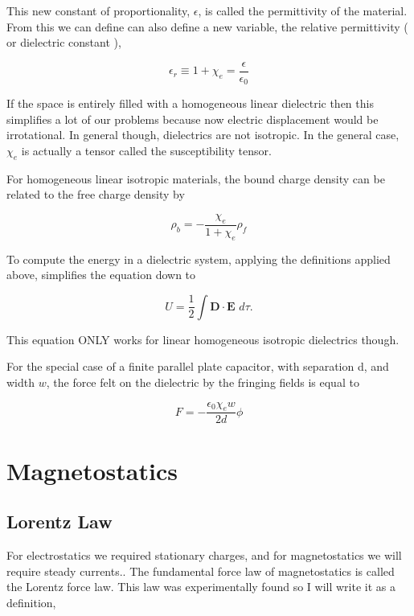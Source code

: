 \documentclass[preprint, review,12pt]{elsarticle}
\def\.{\cdot}
\def\b{\textbf}
\def\={\equiv}
\begin{document}
This new constant of proportionality, $\epsilon$, is called the permittivity of the material. From this we can define can also define a new variable, the relative permittivity ( or dielectric constant ), 

\begin{equation}
    \epsilon_r \= 1 + \chi_e = \frac{\epsilon}{\epsilon_0}
\end{equation}

If the space is entirely filled with a homogeneous linear dielectric then this simplifies a lot of our problems because now electric displacement would be irrotational. In general though, dielectrics are not isotropic. In the general case, $\chi_e$ is actually a tensor called the susceptibility tensor. 

For homogeneous linear isotropic materials, the bound charge density can be related to the free charge density by

\begin{equation}
    \rho_b = - \frac{\chi_e}{1+\chi_e}\rho_f
\end{equation}

To compute the energy in a dielectric system, applying the definitions applied above, simplifies the equation down to

\begin{equation}
    U = \frac{1}{2}\int \b{D}\. \b{E} \hspace{4pt} d\tau.
\end{equation}

This equation ONLY works for linear homogeneous isotropic dielectrics though.

For the special case of a finite parallel plate capacitor, with separation d, and width $w$, the force felt on the dielectric by the fringing fields is equal to 

\begin{equation}
    F = -\frac{\epsilon_0\chi_ew}{2d}\phi
\end{equation}

\section{Magnetostatics}

\subsection{Lorentz Law}

For electrostatics we required stationary charges, and for magnetostatics we will require steady currents.. The fundamental force law of magnetostatics is called the Lorentz force law. This law was experimentally found so I will write it as a definition,
\end{document}
